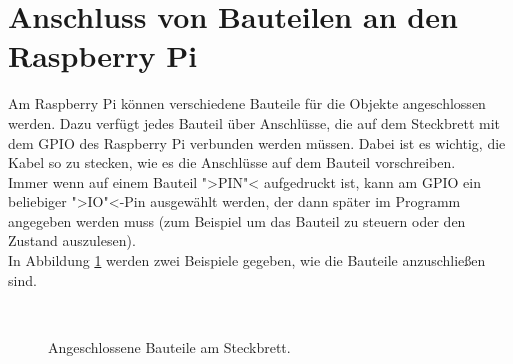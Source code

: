 \documentclass[11pt, a4paper]{article}
\begin{document}

\section*{Anschluss von Bauteilen an den Raspberry Pi}

Am Raspberry Pi können verschiedene Bauteile für die Objekte angeschlossen werden. Dazu verfügt jedes Bauteil über Anschlüsse, die auf dem Steckbrett mit dem GPIO des Raspberry Pi verbunden werden müssen. Dabei ist es wichtig, die Kabel so zu stecken, wie es die Anschlüsse auf dem Bauteil vorschreiben.\\

Immer wenn auf einem Bauteil ">PIN"< aufgedruckt ist, kann am GPIO ein beliebiger ">IO"<-Pin ausgewählt werden, der dann später im Programm angegeben werden muss (zum Beispiel um das Bauteil zu steuern oder den Zustand auszulesen).\\

In Abbildung \ref{fig:bauteile_steckbrett} werden zwei Beispiele gegeben, wie die Bauteile anzuschließen sind.

\begin{figure}[htb]
    \centering
     ~
    \caption{Angeschlossene Bauteile am Steckbrett.}
    \label{fig:bauteile_steckbrett}
\end{figure}
\end{document}
